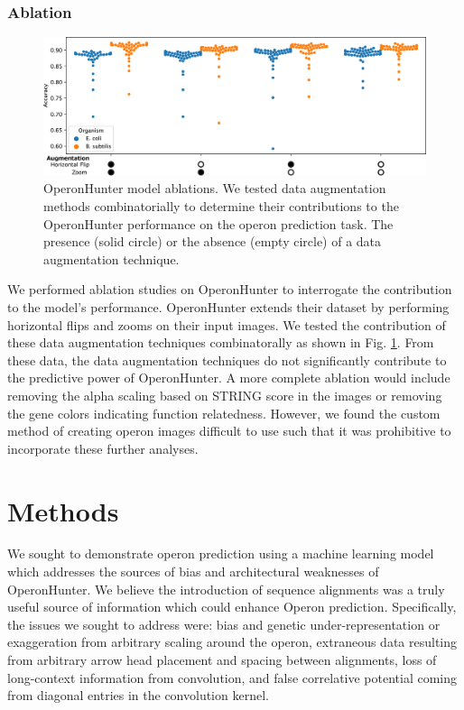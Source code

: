 \documentclass{article}
\begin{document}
\subsubsection{Ablation}
\begin{figure} [h]
  \centering
  \includegraphics[width=.8\textwidth]{images/OperonHunter_ablation.png}
  \caption{OperonHunter model ablations. We tested data augmentation methods combinatorially to determine their contributions to the OperonHunter performance on the operon prediction task. The presence (solid circle) or the absence (empty circle) of a data augmentation technique.}
  \label{fig:operonhunter_ablation}
\end{figure}

We performed ablation studies on OperonHunter to interrogate the contribution to the model's performance. OperonHunter extends their dataset by performing horizontal flips and zooms on their input images. We tested the contribution of these data augmentation techniques combinatorally as shown in Fig. \ref{fig:operonhunter_ablation}. From these data, the data augmentation techniques do not significantly contribute to the predictive power of OperonHunter. A more complete ablation would include removing the alpha scaling based on STRING score in the images or removing the gene colors indicating function relatedness. However, we found the custom method of creating operon images difficult to use such that it was prohibitive to incorporate these further analyses.



\section{Methods}

We sought to demonstrate operon prediction using a machine learning model which addresses the sources of bias and architectural weaknesses of OperonHunter. We believe the introduction of sequence alignments was a truly useful source of information which could enhance Operon prediction. Specifically, the issues we sought to address were: bias and genetic under-representation or exaggeration from arbitrary scaling around the operon, extraneous data resulting from arbitrary arrow head placement and spacing between alignments, loss of long-context information from convolution, and false correlative potential coming from diagonal entries in the convolution kernel.
\end{document}
